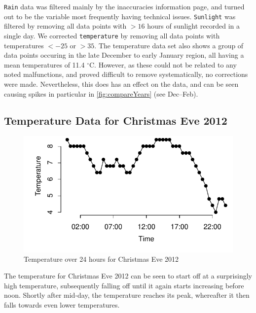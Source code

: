 \documentclass[10pt]{article}\usepackage[]{graphicx}\usepackage[]{color}
\makeatletter
\def\maxwidth{ %
  \ifdim\Gin@nat@width>\linewidth
    \linewidth
  \else
    \Gin@nat@width
  \fi
}
\newenvironment{knitrout}{}{} %
\theoremstyle{plain}
\makeatother
\begin{document}
\texttt{Rain} data was filtered mainly by the inaccuracies information page, and turned out to be the variable most frequently having technical issues. \texttt{Sunlight} was filtered by removing all data points with $> 16$ hours of sunlight recorded in a single day. We corrected \texttt{temperature} by removing all data points with temperatures $< -25$ or $> 35$. The temperature data set also shows a group of data points occuring in the late December to early January region, all having a mean temperatures of 11.4 $^\circ$C. However, as these could not be related to any noted malfunctions, and proved difficult to remove systematically, no corrections were made. Nevertheless, this does has an effect on the data, and can be seen causing spikes in particular in \cref{fig:compareYears} (see Dec--Feb).


\subsection{Temperature Data for Christmas Eve 2012}
\begin{knitrout}
\color{fgcolor}\begin{figure}[H]

{\centering \includegraphics[width=\maxwidth]{figure/graphics-christmas-1} 

}

\caption[Temperature over 24 hours for Christmas Eve 2012]{Temperature over 24 hours for Christmas Eve 2012}\label{fig:christmas}
\end{figure}


\end{knitrout}
The temperature for Christmas Eve 2012 can be seen to start off at a surprisingly high temperature, subsequently falling off until it again starts increasing before noon. Shortly after mid-day, the temperature reaches its peak, whereafter it then falls towards even lower temperatures. 
\end{document}
